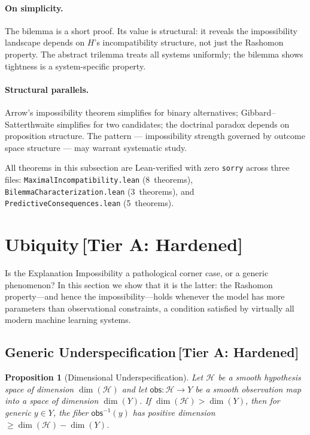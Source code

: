 \documentclass[11pt,a4paper]{article}
\newtheorem{proposition}[theorem]{Proposition}
\newcommand{\sH}{\mathcal{H}}
\begin{document}
\paragraph{On simplicity.} The bilemma is a short proof. Its value is structural: it reveals the impossibility landscape depends on $H$'s incompatibility structure, not just the Rashomon property. The abstract trilemma treats all systems uniformly; the bilemma shows tightness is a system-specific property.

\paragraph{Structural parallels.} Arrow's impossibility theorem simplifies for binary alternatives; Gibbard--Satterthwaite simplifies for two candidates; the doctrinal paradox depends on proposition structure. The pattern --- impossibility strength governed by outcome space structure --- may warrant systematic study.

All theorems in this subsection are Lean-verified with zero
\texttt{sorry} across three files: \texttt{MaximalIncompatibility.lean} (8~theorems), \texttt{BilemmaCharacterization.lean} (3~theorems), and \texttt{PredictiveConsequences.lean} (5~theorems).

\section{Ubiquity\,\textnormal{\normalsize[Tier A: Hardened]}}
\label{sec:ubiquity}

Is the Explanation Impossibility a pathological corner case, or a
generic phenomenon?  In this section we show that it is the latter: the
Rashomon property---and hence the impossibility---holds whenever the model
has more parameters than observational constraints, a condition satisfied by
virtually all modern machine learning systems.

\subsection{Generic Underspecification\,\textnormal{\normalsize[Tier A: Hardened]}}
\label{sec:generic-underspec}

\begin{proposition}[Dimensional Underspecification]
\label{prop:generic-underspec}
Let $\sH$ be a smooth hypothesis space of dimension $\dim(\sH)$ and let
$\mathsf{obs} : \sH \to Y$ be a smooth observation map into a space of
dimension $\dim(Y)$.  If $\dim(\sH) > \dim(Y)$, then for generic
$y \in Y$, the fiber $\mathsf{obs}^{-1}(y)$ has positive dimension
$\geq \dim(\sH) - \dim(Y)$.
\end{proposition}
\end{document}
